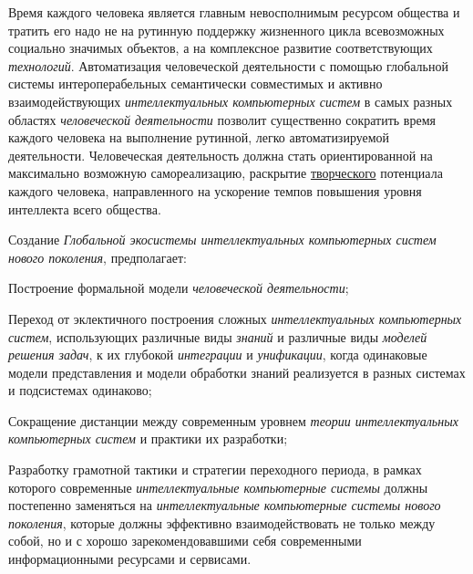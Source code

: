 Время каждого человека является главным невосполнимым ресурсом общества и тратить его надо не на рутинную поддержку жизненного цикла всевозможных социально значимых объектов, а на комплексное развитие соответствующих \textit{технологий}. Автоматизация человеческой деятельности с помощью глобальной системы интероперабельных семантически совместимых и активно взаимодействующих \textit{интеллектуальных компьютерных систем} в самых разных областях \textit{человеческой деятельности} позволит существенно сократить время каждого человека на выполнение рутинной, легко автоматизируемой деятельности. Человеческая деятельность должна стать ориентированной на максимально возможную самореализацию, раскрытие \underline{творческого} потенциала каждого человека, направленного на ускорение темпов повышения уровня интеллекта всего общества.

Создание \textit{Глобальной экосистемы интеллектуальных компьютерных систем нового поколения}, предполагает:

\begin{textitemize}
	\item
	Построение формальной модели \textit{человеческой деятельности};
	\item
	Переход от эклектичного построения сложных \textit{интеллектуальных компьютерных систем}, использующих различные виды \textit{знаний} и различные виды \textit{моделей решения задач}, к их глубокой \textit{интеграции} и \textit{унификации}, когда одинаковые модели представления и модели обработки знаний реализуется в разных системах и подсистемах одинаково;
	\item
	Сокращение дистанции между современным уровнем \textit{теории интеллектуальных компьютерных систем} и практики их разработки;
	\item
	Разработку грамотной тактики и стратегии переходного периода, в рамках которого современные \textit{интеллектуальные компьютерные системы} должны постепенно заменяться на \textit{интеллектуальные компьютерные системы нового поколения}, которые должны эффективно взаимодействовать не только между собой, но и с хорошо зарекомендовавшими себя современными информационными ресурсами и сервисами.
\end{textitemize}

%